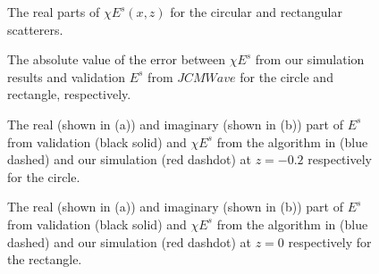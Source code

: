 \documentclass[preprint,12pt]{elsarticle}
\begin{document}
\begin{figure}[htb]
\centering 
{} 
\caption{The real parts of $\chi E^s (x,z)$ for the circular and rectangular scatterers.} 
\label{realpart}
\end{figure}

 \begin{figure}[htb]
\centering {} 
\caption{The absolute value of the error between $\chi E^s$ from our simulation results and validation $E^s$ from $JCMWave$ for the circle and rectangle, respectively.}
\label{error}
 \end{figure}
 
\begin{figure}[htb]
 \centering {} 
 \caption{The real (shown in (a)) and imaginary (shown in (b)) part of $E^s$ from validation (black solid) and $\chi E^s$ from the algorithm in \cite{Dilz2016The} (blue dashed) and our simulation (red dashdot) at $z = -0.2$ respectively for the circle.}
 \label{example1_z_neg02}
 \end{figure}
 \begin{figure}[htb]
 \centering {} 
 \caption{The real (shown in (a)) and imaginary (shown in (b)) part of $E^s$ from validation (black solid) and $\chi E^s$ from the algorithm in \cite{Dilz2016The} (blue dashed) and our simulation (red dashdot) at $z = 0$ respectively for the rectangle.}
 \label{example2_z_0}
 \end{figure}
\end{document}
